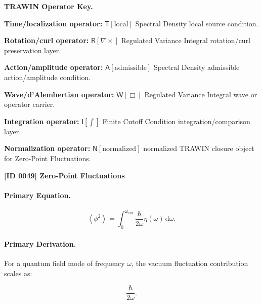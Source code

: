 \par\vspace{0.45\baselineskip}
\noindent\begin{minipage}[t]{\linewidth}
\begingroup
\small
\raggedright
\textbf{TRAWIN Operator Key.}\par
\noindent\textbf{Time/localization operator:} $\mathsf{T}\!\left[\mathrm{local}\right]$ Spectral Density local source condition.\par
\noindent\textbf{Rotation/curl operator:} $\mathsf{R}\!\left[\nabla\times\right]$ Regulated Variance Integral rotation/curl preservation layer.\par
\noindent\textbf{Action/amplitude operator:} $\mathsf{A}\!\left[\mathrm{admissible}\right]$ Spectral Density admissible action/amplitude condition.\par
\noindent\textbf{Wave/d'Alembertian operator:} $\mathsf{W}\!\left[\Box\right]$ Regulated Variance Integral wave or operator carrier.\par
\noindent\textbf{Integration operator:} $\mathsf{I}\!\left[\int\right]$ Finite Cutoff Condition integration/comparison layer.\par
\noindent\textbf{Normalization operator:} $\mathsf{N}\!\left[\mathrm{normalized}\right]$ normalized TRAWIN closure object for Zero-Point Fluctuations.\par
\endgroup
\end{minipage}

\clearpage
\noindent\textbf{[ID 0049] Zero-Point Fluctuations}\par
\vspace{0.35em}
\paragraph{Primary Equation.}
\begin{equation}
\left\langle\phi^2\right\rangle
=
\int_{0}^{\omega_{\mathrm{cut}}}
\frac{\hbar}{2\omega}
\eta(\omega)
\,\mathrm{d}\omega .
\end{equation}

\paragraph{Primary Derivation.}
For a quantum field mode of frequency $\omega$, the vacuum fluctuation contribution scales as:

\begin{equation}
\frac{\hbar}{2\omega}.
\end{equation}

